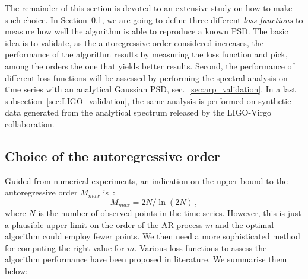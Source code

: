 \documentclass{aa}
\begin{document}
The remainder of this section is devoted to an extensive study on how to make such choice.
In Section~\ref{sec:optimizers}, we are going to define three different \textit{loss functions} to measure how well the 
algorithm is able to reproduce a known PSD.
The basic idea is to validate, as the autoregressive order considered increases, the performance of the algorithm results 
by measuring the loss function and pick, among the orders the one that yields better results.
Second, the performance of different loss functions will be assessed by performing the spectral analysis on time series with an analytical Gaussian PSD, sec.~\ref{sec:arp_validation}.
In a last subsection~\ref{sec:LIGO_validation}, the same analysis is performed on synthetic data generated from the analytical spectrum released by the LIGO-Virgo collaboration.

\subsection{Choice of the autoregressive order}\label{sec:optimizers} 

Guided from numerical experiments, an indication on the upper bound to the autoregressive order $M_{max}$ is~\citep{doi:10.1190/1.1440902}:
\begin{equation}\label{eq:MMAx}
M_{max} = 2N / \ln{(2N)}\,,
\end{equation}
where $N$ is the number of observed points in the time-series.
However, this is just a plausible upper limit on the order of the AR process $m$ and the optimal algorithm could employ fewer points.
We then need a more sophisticated method for computing the right value for $m$.
Various loss functions to assess the algorithm performance have been proposed in literature.
We summarise them below:
\end{document}
